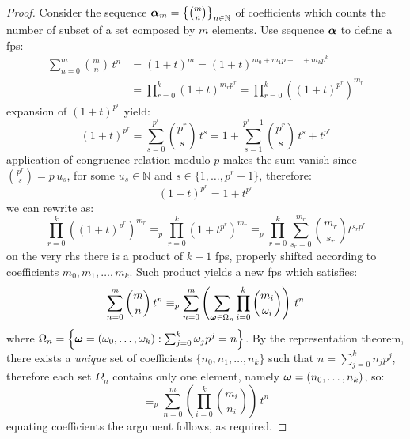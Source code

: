 \begin{proof}
    Consider the sequence $\boldsymbol{\alpha}_{m}=\left\lbrace{{m}\choose{n}}\right\rbrace_{n\in\mathbb{N}}$ 
    of coefficients which counts the number of subset
    of a set composed by $m$ elements. Use sequence $\boldsymbol{\alpha}$ to define a \ac{fps}:
    \begin{displaymath}
        \begin{split}
            \sum_{n=0}^{m}{{{m}\choose{n}}\,t^{n}} &= \left(1+t\right)^{m}
                = \left(1+t\right)^{m_{0}+m_{1}p+\ldots+m_{k}p^{k}}\\
                &= \prod_{r=0}^{k}{{\left(1+t\right)^{m_{r}p^{r}}}}
                = \prod_{r=0}^{k}{\left(\left(1+t\right)^{p^{r}}\right)^{m_{r}}}
        \end{split}
    \end{displaymath}
    expansion of $\left(1+t\right)^{p^{r}}$ yield: 
    \begin{displaymath}
            \left(1+t\right)^{p^{r}} = \sum_{s=0}^{p^{r}}{{{p^{r}}\choose{s}}\,t^{s}}
                = 1+\sum_{s=1}^{p^{r}-1}{{{p^{r}}\choose{s}}\,t^{s}}+t^{p^{r}}
    \end{displaymath}
    application of congruence relation modulo $p$ makes the sum vanish since ${{p^{r}}\choose{s}}=p\,u_{s}$,
    for some $u_{s}\in\mathbb{N}$ and $s\in\lbrace 1,\ldots,p^{r}-1\rbrace$, therefore:
    \begin{displaymath}
        \left(1+t\right)^{p^{r}} = 1+t^{p^{r}}
    \end{displaymath}
    we can rewrite as:
    \begin{displaymath}
        \prod_{r=0}^{k}{\left(\left(1+t\right)^{p^{r}}\right)^{m_{r}}}
            \equiv_{p} \prod_{r=0}^{k}{\left(1+t^{p^{r}}\right)^{m_{r}}}
            \equiv_{p} \prod_{r=0}^{k}{\sum_{s_{r}=0}^{m_{r}}{{{m_{r}}\choose{s_{r}}}t^{s_{r}p^{r}}}}
    \end{displaymath}
    on the very \ac{rhs} there is a product of $k+1$ \ac{fps}, properly shifted according to coefficients
    $m_{0},m_{1},\ldots,m_{k}$. Such product yields a new \ac{fps} which satisfies:
    \begin{displaymath}
        \sum_{n=0}^{m}{{{m}\choose{n}}\,t^{n}} 
        \equiv_{p}
        \sum_{n=0}^{m}{\left(\sum_{\boldsymbol{\omega}\in\Omega_{n}}{\prod_{i=0}^{k}{{{m_{i}}\choose{\omega_{i}}}}}\right)\,t^{n}}
    \end{displaymath}
    where $\Omega_{n}=\left\lbrace\boldsymbol{\omega}=\left(\omega_{0},\ldots,\omega_{k}\right):
        \sum_{j=0}^{k}{\omega_{j}p^{j}}=n\right\rbrace$.
    By the representation theorem, there exists a \emph{unique} set of coefficients
    $\lbrace n_{0},n_{1},\ldots,n_{k}\rbrace$ such that $n=\sum_{j=0}^{k}{n_{j}p^{j}}$, therefore
    each set $\Omega_{n}$ contains only one element, namely $\boldsymbol{\omega}=(n_{0},\ldots,n_{k})$, so:
    \begin{displaymath}
        \equiv_{p} \sum_{n=0}^{m}{\left({\prod_{i=0}^{k}{{{m_{i}}\choose{n_{i}}}}}\right)\,t^{n}}
    \end{displaymath}
    equating coefficients the argument follows, as required.


\end{proof}
